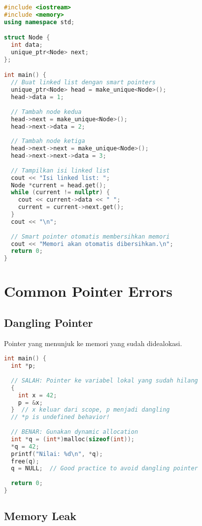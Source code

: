 \documentclass[../main.tex]{subfiles}
\begin{document}
\begin{lstlisting}[language=C++, caption={Linked list sederhana di C++}]
#include <iostream>
#include <memory>
using namespace std;

struct Node {
  int data;
  unique_ptr<Node> next;
};

int main() {
  // Buat linked list dengan smart pointers
  unique_ptr<Node> head = make_unique<Node>();
  head->data = 1;
  
  // Tambah node kedua
  head->next = make_unique<Node>();
  head->next->data = 2;
  
  // Tambah node ketiga
  head->next->next = make_unique<Node>();
  head->next->next->data = 3;
  
  // Tampilkan isi linked list
  cout << "Isi linked list: ";
  Node *current = head.get();
  while (current != nullptr) {
    cout << current->data << " ";
    current = current->next.get();
  }
  cout << "\n";
  
  // Smart pointer otomatis membersihkan memori
  cout << "Memori akan otomatis dibersihkan.\n";
  return 0;
}
\end{lstlisting}

\section{Common Pointer Errors}

\subsection{Dangling Pointer}

Pointer yang menunjuk ke memori yang sudah didealokasi.

\begin{lstlisting}[language=C, caption={Dangling pointer problem}]
int main() {
  int *p;
  
  // SALAH: Pointer ke variabel lokal yang sudah hilang
  {
    int x = 42;
    p = &x;
  }  // x keluar dari scope, p menjadi dangling
  // *p is undefined behavior!
  
  // BENAR: Gunakan dynamic allocation
  int *q = (int*)malloc(sizeof(int));
  *q = 42;
  printf("Nilai: %d\n", *q);
  free(q);
  q = NULL;  // Good practice to avoid dangling pointer
  
  return 0;
}
\end{lstlisting}

\subsection{Memory Leak}
\end{document}
